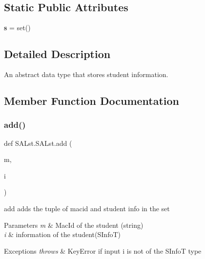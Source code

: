 \subsection*{Static Public Attributes}
\begin{DoxyCompactItemize}
\item 
\mbox{\label{class_s_a_lst_1_1_s_a_lst_afad925550fca16ca7c9f028df1a902ca}} 
{\bfseries s} = set()
\end{DoxyCompactItemize}


\subsection{Detailed Description}
An abstract data type that stores student information. 

\subsection{Member Function Documentation}
\mbox{\label{class_s_a_lst_1_1_s_a_lst_aa262f4e962a9957c18833f65dc07c72a}} 
\subsubsection{\texorpdfstring{add()}{add()}}
{\footnotesize\ttfamily def S\+A\+Lst.\+S\+A\+Lst.\+add (\begin{DoxyParamCaption}\item[{}]{m,  }\item[{}]{i }\end{DoxyParamCaption})\hspace{0.3cm}{\ttfamily [static]}}



add adds the tuple of macid and student info in the set 


\begin{DoxyParams}{Parameters}
{\em m} & Mac\+Id of the student (string) \\
\hline
{\em i} & information of the student(\+S\+Info\+T) \\
\hline
\end{DoxyParams}

\begin{DoxyExceptions}{Exceptions}
{\em throws} & Key\+Error if input i is not of the S\+InfoT type \\
\hline
\end{DoxyExceptions}
\mbox{\label{class_s_a_lst_1_1_s_a_lst_a8cdba5b89e936165b3628f52d4e80938}} 
